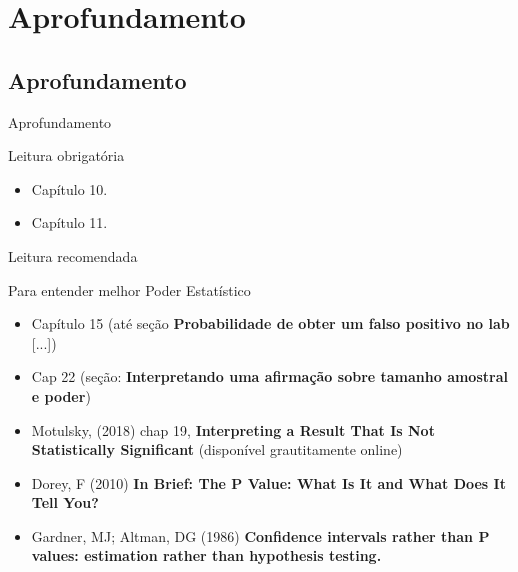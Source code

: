 \documentclass{beamer}
\begin{document}
\section{Aprofundamento}

\subsection{Aprofundamento}

\begin{frame}{\scriptsize Aprofundamento}
  \begin{block}{Leitura obrigatória}
    \footnotesize
    \begin{itemize}
      \footnotesize
    \item Capítulo 10.
    \item Capítulo 11.
    \end{itemize}
  \end{block}
  \begin{block}{Leitura recomendada}
    \scriptsize
    \begin{block}{\scriptsize Para entender melhor Poder Estatístico}
      \begin{itemize}
        \scriptsize
      \item Capítulo 15 ({\tiny até seção {\bf Probabilidade de obter um falso positivo no lab} [...]})
      \end{itemize}
    \end{block}
    \begin{itemize}
      \tiny
    \item Cap 22 (seção: {\bf Interpretando uma afirmação sobre tamanho amostral e poder})
    \item Motulsky, (2018) chap 19, {\bf Interpreting a Result That Is Not Statistically Significant} (disponível grautitamente online)
    \item Dorey, F (2010) {\bf In Brief: The P Value: What Is It and What Does It Tell You?}
    \item Gardner, MJ; Altman, DG (1986) {\bf Confidence intervals rather than P values: estimation rather than hypothesis testing.}
    \end{itemize}
  \end{block}
\end{frame}
\end{document}
